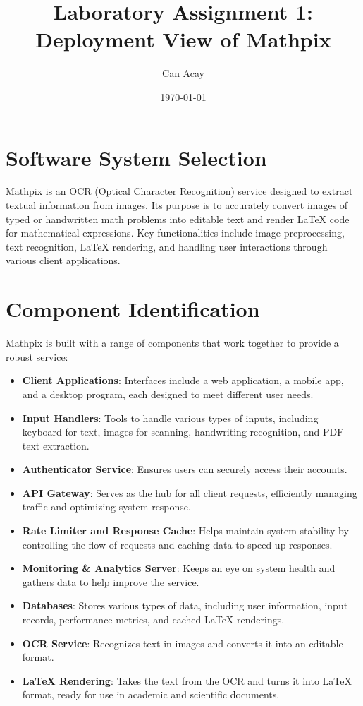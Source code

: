 \documentclass{article}
\title{Laboratory Assignment 1: Deployment View of Mathpix}
\author{Can Acay}
\date{\today}
\begin{document}
\maketitle
\newpage

\tableofcontents
\newpage

\section{Software System Selection}
Mathpix is an OCR (Optical Character Recognition) service designed to extract textual information from images. Its purpose is to accurately convert images of typed or handwritten math problems into editable text and render LaTeX code for mathematical expressions. Key functionalities include image preprocessing, text recognition, LaTeX rendering, and handling user interactions through various client applications.

\section{Component Identification}
Mathpix is built with a range of components that work together to provide a robust service:

\begin{itemize}
    \item \textbf{Client Applications}: Interfaces include a web application, a mobile app, and a desktop program, each designed to meet different user needs.
    \item \textbf{Input Handlers}: Tools to handle various types of inputs, including keyboard for text, images for scanning, handwriting recognition, and PDF text extraction.
    \item \textbf{Authenticator Service}: Ensures users can securely access their accounts.
    \item \textbf{API Gateway}: Serves as the hub for all client requests, efficiently managing traffic and optimizing system response.
    \item \textbf{Rate Limiter and Response Cache}: Helps maintain system stability by controlling the flow of requests and caching data to speed up responses.
    \item \textbf{Monitoring \& Analytics Server}: Keeps an eye on system health and gathers data to help improve the service.
    \item \textbf{Databases}: Stores various types of data, including user information, input records, performance metrics, and cached LaTeX renderings.
    \item \textbf{OCR Service}: Recognizes text in images and converts it into an editable format.
    \item \textbf{LaTeX Rendering}: Takes the text from the OCR and turns it into LaTeX format, ready for use in academic and scientific documents.
\end{itemize}
\end{document}
